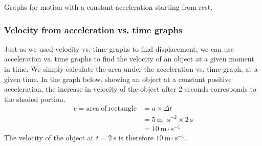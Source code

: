 \begin{center}
% 
% 
% 
% 
% 
% 
% 
\vspace{\baselineskip}
\caption{Graphs for motion with a constant acceleration starting from rest.}
\label{fig:pr:acceleration:uniform}
\end{center}

        \label{m38795*uid115}
\subsubsection*{Velocity from acceleration vs. time graphs}
            \nopagebreak
          \label{m38795*id72754}Just as we used velocity vs. time graphs to find displacement, we can use acceleration vs. time graphs to find the velocity of an object at a given moment in time. We simply calculate the area under the acceleration vs. time graph, at a given time. In the graph below, showing an object at a constant positive acceleration, the increase in velocity of the object after 2 seconds corresponds to the shaded portion.   
    \begin{align*}
    v=\text{area}~\text{of}~\text{rectangle}&= a\ensuremath{\times}\Delta t\\ 
      &= 5~\text{m}\ensuremath{\cdot}{\text{s}}^{-2}\ensuremath{\times}2~\text{s}\\ 
      &= 10~\text{m}\ensuremath{\cdot}{\text{s}}^{-1}
      \end{align*}
          \label{m38795*id72897}The velocity of the object at $t=2~\text{s}$ is therefore $10~\text{m}\ensuremath{\cdot}\text{s}{}^{-1}$. %
    \label{m38795*cid8}
